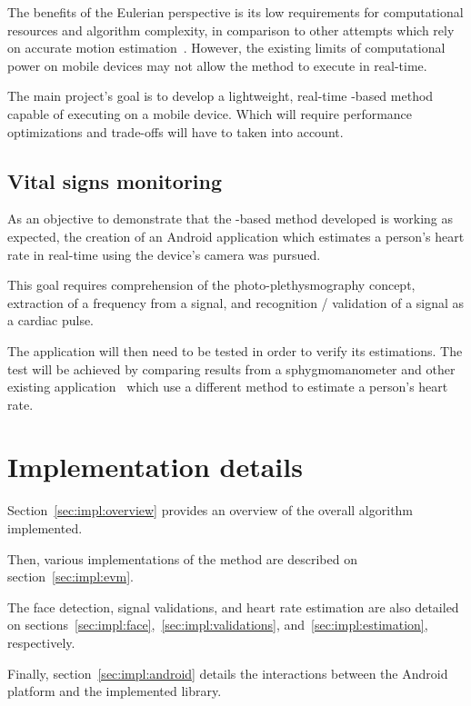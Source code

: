 The benefits of the Eulerian perspective is its low requirements for
computational resources and algorithm complexity, in comparison to other
attempts which rely on accurate motion estimation~\cite{Liu2005Motion}.
However, the existing limits of computational power on mobile devices
may not allow the \evm{} method to execute in real-time.

The main project's goal is to develop a lightweight, real-time \evm{}-based
method capable of executing on a mobile device. Which will require
performance optimizations and trade-offs will have to taken into account.

\subsection{Vital signs monitoring} \label{sec:problem:heart}

As an objective to demonstrate that the \evm{}-based method developed is
working as expected, the creation of an Android application which
estimates a person's heart rate in real-time using the device's camera was
pursued.

This goal requires comprehension of the photo-plethysmography concept,
extraction of a frequency from a signal, and recognition / validation of a
signal as a cardiac pulse.

The application will then need to be tested in order to verify its estimations.
The test will be achieved by comparing results from a sphygmomanometer and
other existing application~\cite{Vitrox2013} which use a different
method to estimate a person's heart rate.

\section{Implementation details} \label{sec:impl:details}

Section~\ref{sec:impl:overview} provides an overview of the overall algorithm
implemented.

Then, various implementations of the \evm{} method are described on
section~\ref{sec:impl:evm}.

The face detection, signal validations, and heart rate estimation are
also detailed on sections~\ref{sec:impl:face},~\ref{sec:impl:validations},
and~\ref{sec:impl:estimation}, respectively.

Finally, section~\ref{sec:impl:android} details the interactions between
the Android platform and the implemented library.

